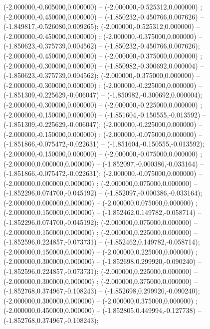  (-2.000000,-0.605000,0.000000) -- (-2.000000,-0.525312,0.000000) ;
 (-2.000000,-0.450000,0.000000) -- (-1.850232,-0.450766,0.007626) -- (-1.849817,-0.526080,0.009265);
 (-2.000000,-0.525312,0.000000) -- (-2.000000,-0.450000,0.000000) ;
 (-2.000000,-0.375000,0.000000) -- (-1.850623,-0.375739,0.004562) -- (-1.850232,-0.450766,0.007626);
 (-2.000000,-0.450000,0.000000) -- (-2.000000,-0.375000,0.000000) ;
 (-2.000000,-0.300000,0.000000) -- (-1.850982,-0.300692,0.000004) -- (-1.850623,-0.375739,0.004562);
 (-2.000000,-0.375000,0.000000) -- (-2.000000,-0.300000,0.000000) ;
 (-2.000000,-0.225000,0.000000) -- (-1.851309,-0.225629,-0.006047) -- (-1.850982,-0.300692,0.000004);
 (-2.000000,-0.300000,0.000000) -- (-2.000000,-0.225000,0.000000) ;
 (-2.000000,-0.150000,0.000000) -- (-1.851604,-0.150555,-0.013592) -- (-1.851309,-0.225629,-0.006047);
 (-2.000000,-0.225000,0.000000) -- (-2.000000,-0.150000,0.000000) ;
 (-2.000000,-0.075000,0.000000) -- (-1.851866,-0.075472,-0.022631) -- (-1.851604,-0.150555,-0.013592);
 (-2.000000,-0.150000,0.000000) -- (-2.000000,-0.075000,0.000000) ;
 (-2.000000,0.000000,0.000000) -- (-1.852097,-0.000386,-0.033164) -- (-1.851866,-0.075472,-0.022631);
 (-2.000000,-0.075000,0.000000) -- (-2.000000,0.000000,0.000000) ;
 (-2.000000,0.075000,0.000000) -- (-1.852296,0.074700,-0.045192) -- (-1.852097,-0.000386,-0.033164);
 (-2.000000,0.000000,0.000000) -- (-2.000000,0.075000,0.000000) ;
 (-2.000000,0.150000,0.000000) -- (-1.852462,0.149782,-0.058714) -- (-1.852296,0.074700,-0.045192);
 (-2.000000,0.075000,0.000000) -- (-2.000000,0.150000,0.000000) ;
 (-2.000000,0.225000,0.000000) -- (-1.852596,0.224857,-0.073731) -- (-1.852462,0.149782,-0.058714);
 (-2.000000,0.150000,0.000000) -- (-2.000000,0.225000,0.000000) ;
 (-2.000000,0.300000,0.000000) -- (-1.852698,0.299920,-0.090240) -- (-1.852596,0.224857,-0.073731);
 (-2.000000,0.225000,0.000000) -- (-2.000000,0.300000,0.000000) ;
 (-2.000000,0.375000,0.000000) -- (-1.852768,0.374967,-0.108243) -- (-1.852698,0.299920,-0.090240);
 (-2.000000,0.300000,0.000000) -- (-2.000000,0.375000,0.000000) ;
 (-2.000000,0.450000,0.000000) -- (-1.852805,0.449994,-0.127738) -- (-1.852768,0.374967,-0.108243);
